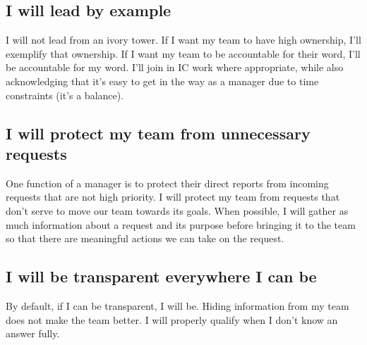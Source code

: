 \documentclass[11pt]{amsart}
\begin{document}
\subsection{I will lead by example}
I will not lead from an ivory tower. If I want my team to have high ownership, I'll exemplify that ownership. If I want my team to be accountable for their word, I'll be accountable for my word. I'll join in IC work where appropriate, while also acknowledging that it's easy to get in the way as a manager due to time constraints (it's a balance).

\subsection{I will protect my team from unnecessary requests}
One function of a manager is to protect their direct reports from incoming requests that are not high priority. I will protect my team from requests that don’t serve to move our team towards its goals. When possible, I will gather as much information about a request and its purpose before bringing it to the team so that there are meaningful actions we can take on the request.

\subsection{I will be transparent everywhere I can be}
By default, if I can be transparent, I will be. Hiding information from my team does not make the team better. I will properly qualify when I don’t know an answer fully.

\end{document}
